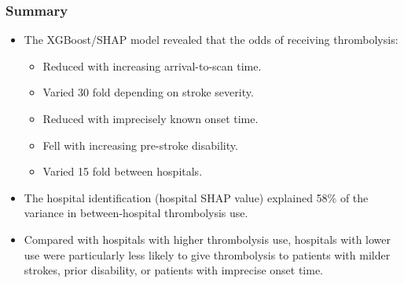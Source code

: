 
\begin{frame}
\frametitle{Summary}
\small

\begin{itemize}
    \item The XGBoost/SHAP model revealed that the odds of receiving thrombolysis:

    \begin{itemize}
        \item Reduced with increasing arrival-to-scan time.
        \item Varied 30 fold depending on stroke severity.
        \item Reduced with imprecisely known onset time.
        \item Fell with increasing pre-stroke disability.
        \item Varied 15 fold between hospitals. 
    \end{itemize}

\item The hospital identification (hospital SHAP value) explained 58\% of the variance in between-hospital thrombolysis use. 

\item Compared with hospitals with higher thrombolysis use, hospitals with lower use were particularly less likely to give thrombolysis to patients with milder strokes, prior disability, or patients with imprecise onset time.
\end{itemize}

\end{frame}
